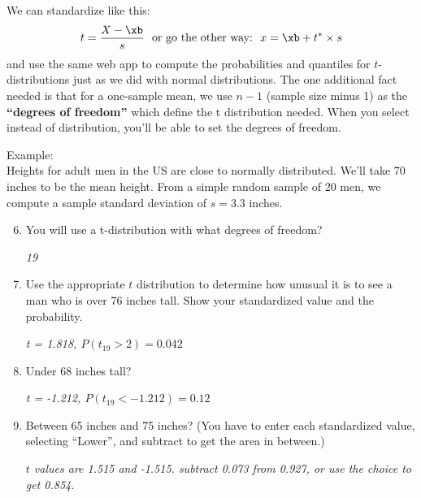We can standardize like this:
$$ t = \frac{X - \xb}{s}\mbox{\ \  or go the other way:\ \ } x = \xb
+ t^* \times s$$
and use the same web app to compute the 
probabilities and quantiles for $t$-distributions just as we did with normal
distributions. The one additional fact needed is that for a one-sample
mean, we use $n-1$ (sample size minus 1) as the {\bf``degrees of
  freedom''} which define the t distribution needed.  When you select
 instead of  distribution, you'll be able to set
the degrees of freedom.

Example:\\
Heights for adult men in the US are close to normally distributed.
We'll take 70 inches to be the mean height. From a simple random
sample of 20 men,  we compute a sample standard deviation of $s = 3.3$
inches.  
\begin{enumerate}
\setcounter{enumi}{5}
\item You will use a t-distribution with what degrees of freedom?
\begin{students}
        \vspace{1cm}        
\end{students}

\begin{key}
 {\it 19}
\end{key}

\item Use the appropriate $t$ distribution to determine how unusual it
  is to see a man who is over 76 inches tall. Show your standardized
  value and the probability.
\begin{students}
        \vspace{1cm}        
\end{students}

\begin{key}
 {\it t = 1.818, $P(t_{19} > 2) = 0.042$ }
\end{key}

\item Under 68 inches tall?
\begin{students}
        \vspace{1cm}        
\end{students}

\begin{key}
{\it  t = -1.212, $P(t_{19} < -1.212) = 0.12$ }
\end{key}

\item Between 65 inches and 75 inches? (You have to enter each
  standardized value, selecting ``Lower'', and subtract to get the
  area in between.)
\begin{students}
        \vspace{1cm}        
\end{students}

\begin{key}
 {\it $t$ values are 1.515 and -1.515. subtract 0.073 from 0.927,
    or use the  choice to get 0.854. }
\end{key}

\end{enumerate}


